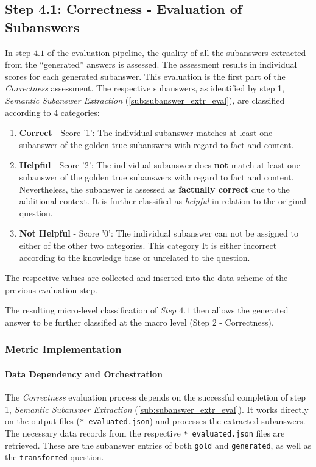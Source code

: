 \subsection[Step 4.1: Correctness]{Step 4.1: Correctness - Evaluation of Subanswers}\label{sub:Step4_1_eval}
%
In step $4.1$ of the evaluation pipeline, the quality of all the subanswers extracted from the \enquote{generated} answers is assessed.
The assessment results in individual scores for each generated subanswer.
%
This evaluation is the first part of the \textit{Correctness} assessment.
The respective subanswers, as identified by step 1, \textit{Semantic Subanswer Extraction} (\cref{sub:subanswer_extr_eval}), are classified according to $4$ categories:
\begin{enumerate}\label{def:correctness_3_cat}
    \item \textbf{Correct} - Score '1': The individual subanswer matches at least one subanswer of the golden true subanswers with regard to fact and content. 
    \item \textbf{Helpful} - Score '2': The individual subanswer does \textbf{not} match at least one subanswer of the golden true subanswers with regard to fact and content.
    Nevertheless, the subanswer is assessed as \textbf{factually correct} due to the additional context.
    It is further classified as \textit{helpful} in relation to the original question.
    \item \textbf{Not Helpful} - Score '0': The individual subanswer can not be assigned to either of the other two categories.
    This category 
    It is either incorrect according to the knowledge base or unrelated to the question.
\end{enumerate}
%
The respective values are collected and inserted into the data scheme of the previous evaluation step.

The resulting micro-level classification of \textit{Step $4.1$} then allows the generated answer to be further classified at the macro level (Step 2 - Correctness).
%
\subsubsection{Metric Implementation}

\paragraph{Data Dependency and Orchestration}\label{par:data_orchestrate_Step4_1}
The \textit{Correctness} evaluation process depends on the successful completion of step 1, \textit{Semantic Subanswer Extraction} (\cref{sub:subanswer_extr_eval}).
It works directly on the output files (\texttt{*\_evaluated.json}) and processes the extracted subanswers.
The necessary data records from the respective \texttt{*\_evaluated.json} files are retrieved.
These are the subanswer entries of both \texttt{gold} and \texttt{generated}, as well as the \texttt{transformed} question.

